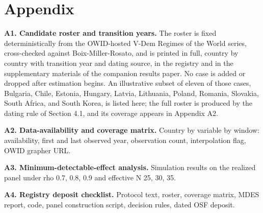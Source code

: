 \documentclass[11pt,letterpaper]{article}
\begin{document}
\section*{Appendix}

\textbf{A1. Candidate roster and transition years.} The roster is fixed deterministically from the OWID-hosted V-Dem Regimes of the World series, cross-checked against Boix-Miller-Rosato, and is printed in full, country by country with transition year and dating source, in the registry and in the supplementary materials of the companion results paper. No case is added or dropped after estimation begins. An illustrative subset of eleven of those cases, Bulgaria, Chile, Estonia, Hungary, Latvia, Lithuania, Poland, Romania, Slovakia, South Africa, and South Korea, is listed here; the full roster is produced by the dating rule of Section 4.1, and its coverage appears in Appendix A2.

\textbf{A2. Data-availability and coverage matrix.} Country by variable by window: availability, first and last observed year, observation count, interpolation flag, OWID grapher URL.

\textbf{A3. Minimum-detectable-effect analysis.} Simulation results on the realized panel under rho 0.7, 0.8, 0.9 and effective N 25, 30, 35.

\textbf{A4. Registry deposit checklist.} Protocol text, roster, coverage matrix, MDES report, code, panel construction script, decision rules, dated OSF deposit.



\end{document}

